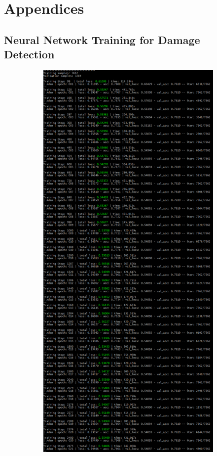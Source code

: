 \setcounter{chapter}{0}
\renewcommand{\thechapter}{\Alph{chapter}}
\chapter{Appendices} \label{append}
\section{Neural Network Training for Damage Detection} \label{an:key}

\begin{figure}[H]
	\centering
	\begin{subfigure}{.475\textwidth}
		\centering
		\includegraphics[width=.975\linewidth]{figs/TrainingDet.png}

\end{subfigure}
\end{figure}
